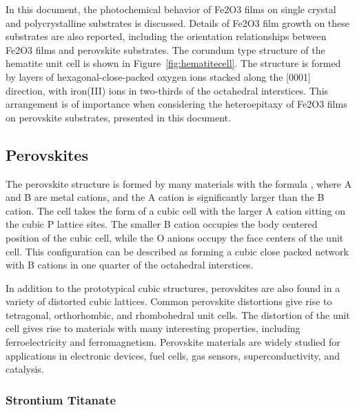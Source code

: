 \documentclass[12pt,%
              twoside,
               letterpaper]{uiothesis}
\begin{document}
In this document, the photochemical behavior of Fe2O3 films on single crystal and
polycrystalline substrates is discussed. Details of Fe2O3 film growth on these
substrates are also reported, including the orientation relationships between Fe2O3
films and perovskite substrates. The corundum type structure of the hematite unit cell is
shown in Figure~\ref{fig:hematitecell}. The structure is formed by layers of
hexagonal-close-packed oxygen ions stacked along the [0001] direction, with iron(III) ions
in two-thirds of the octahedral interstices. This arrangement is of importance when
considering the heteroepitaxy of Fe2O3 films on perovskite substrates, presented in
this document. 

\subsection{Perovskites}\label{subsec:background.perovskites}

The perovskite structure is formed by many materials with the formula , where A
and B are metal cations, and the A cation is significantly larger than the B
cation.\cite{Bhalla:2000ku} The cell takes the form of a cubic cell with the larger A
cation sitting on the cubic P lattice sites. The smaller B cation occupies the body
centered position of the cubic cell, while the O anions occupy the face centers of the
unit cell. This configuration can be described as  forming a cubic close packed
network with B cations in one quarter of the octahedral interstices.

In addition to the prototypical cubic structures, perovskites are also found in a variety
of distorted cubic lattices. Common perovskite distortions give rise to tetragonal,
orthorhombic, and rhombohedral unit cells. The distortion of the unit cell gives rise to
materials with many interesting properties, including ferroelectricity and ferromagnetism.
Perovskite materials are widely studied\cite{Bhalla:2000ku} for applications in electronic
devices,\cite{Kingon:2000wa} fuel cells,\cite{Zhu:2003jz,Jiang:2008fb} gas
sensors,\cite{Fergus:2007tm} superconductivity,\cite{Murphy:1987wc} and
catalysis.\cite{Lombardo:1998uv}

\subsubsection{Strontium Titanate}\label{subsubsec:background.sto}
\end{document}
